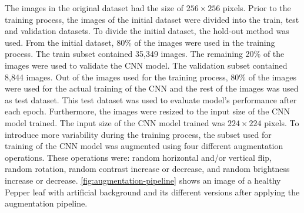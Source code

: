 \documentclass{BachelorBUI}
\begin{document}
        The images in the original dataset had the size of $256 \times 256$ pixels. Prior to the training process, the images of the initial dataset were divided into the train, test and validation datasets. To divide the initial dataset, the hold-out method was used. From the initial dataset, 80\% of the images were used in the training process. The train subset contained 35,349 images. The remaining 20\% of the images were used to validate the CNN model. The validation subset contained 8,844 images. Out of the images used for the training process, 80\% of the images were used for the actual training of the CNN and the rest of the images was used as test dataset. This test dataset was used to evaluate model's performance after each epoch. Furthermore, the images were resized to the input size of the CNN model trained. The input size of the CNN model trained was $224 \times 224$ pixels. To introduce more variability during the training process, the subset used for training of the CNN model was augmented using four different augmentation operations. These operations were: random horizontal and/or vertical flip, random rotation, random contrast increase or decrease, and random brightness increase or decrease. \autoref{fig:augmentation-pipeline} shows an image of a healthy Pepper leaf with artificial background and its different versions after applying the augmentation pipeline.
\end{document}
